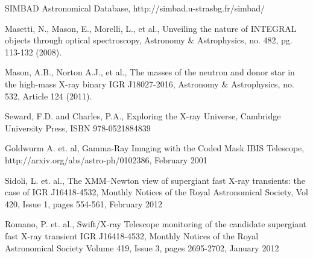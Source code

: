 
\label{app:bibliography} %

\manualmark
\markboth{\spacedlowsmallcaps{\bibname}}{\spacedlowsmallcaps{\bibname}} 






\begin{thebibliography}{99}

SIMBAD Astronomical Database, http://simbad.u-strasbg.fr/simbad/

Masetti, N., Mason, E.,  Morelli, L., et al., Unveiling the nature of INTEGRAL objects through optical spectroscopy, Astronomy & Astrophysics, no. 482, pg. 113-132 (2008).

Mason, A.B., Norton A.J., et al., The masses of the neutron and donor star in the high-mass X-ray binary IGR J18027-2016, Astronomy & Astrophysics, no. 532, Article 124 (2011).

Seward, F.D. and Charles, P.A., Exploring the X-ray Universe, Cambridge University Press, ISBN 978-0521884839

Goldwurm A. et. al, Gamma-Ray Imaging with the Coded Mask IBIS Telescope, http://arxiv.org/abs/astro-ph/0102386, February 2001

Sidoli, L. et. al., The XMM–Newton view of supergiant fast X-ray transients: the case of IGR J16418-4532, Monthly Notices of the Royal Astronomical Society, Vol 420, Issue 1, pages 554-561, February 2012

Romano, P. et. al., Swift/X-ray Telescope monitoring of the candidate supergiant fast X-ray transient IGR J16418-4532, Monthly Notices of the Royal Astronomical Society Volume 419, Issue 3, pages 2695-2702, January 2012


\end{thebibliography}